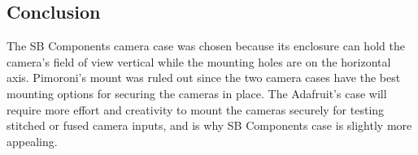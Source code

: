 \subsection{Conclusion}

The SB Components camera case was chosen because its enclosure can hold the camera's 
field of view vertical while the mounting holes are on the horizontal axis. Pimoroni's
mount was ruled out since the two camera cases have the best mounting options for 
securing the cameras in place. The Adafruit's case will require 
more effort and creativity to mount the cameras securely for testing stitched or 
fused camera inputs, and is why SB Components case is slightly more appealing.\\